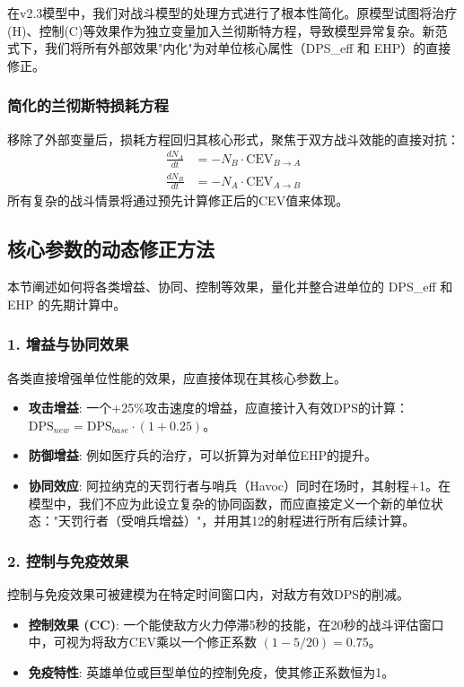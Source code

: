 \documentclass[a4paper,12pt]{article}
\begin{document}
在v2.3模型中，我们对战斗模型的处理方式进行了根本性简化。原模型试图将治疗(H)、控制(C)等效果作为独立变量加入兰彻斯特方程，导致模型异常复杂。新范式下，我们将所有外部效果"内化"为对单位核心属性（DPS\_eff 和 EHP）的直接修正。

\subsubsection{简化的兰彻斯特损耗方程}
移除了外部变量后，损耗方程回归其核心形式，聚焦于双方战斗效能的直接对抗：
\begin{align}
\frac{dN_A}{dt} &= -N_B \cdot \text{CEV}_{B \rightarrow A} \\
\frac{dN_B}{dt} &= -N_A \cdot \text{CEV}_{A \rightarrow B}
\end{align}
所有复杂的战斗情景将通过预先计算修正后的CEV值来体现。

\subsection{核心参数的动态修正方法}
本节阐述如何将各类增益、协同、控制等效果，量化并整合进单位的 DPS\_eff 和 EHP 的先期计算中。

\subsubsection{1. 增益与协同效果}
各类直接增强单位性能的效果，应直接体现在其核心参数上。
\begin{itemize}
    \item \textbf{攻击增益}: 一个+25\%攻击速度的增益，应直接计入有效DPS的计算：$\text{DPS}_{new} = \text{DPS}_{base} \cdot (1 + 0.25)$。
    \item \textbf{防御增益}: 例如医疗兵的治疗，可以折算为对单位EHP的提升。
    \item \textbf{协同效应}: 阿拉纳克的天罚行者与哨兵（Havoc）同时在场时，其射程+1。在模型中，我们不应为此设立复杂的协同函数，而应直接定义一个新的单位状态："天罚行者（受哨兵增益）"，并用其12的射程进行所有后续计算。
\end{itemize}

\subsubsection{2. 控制与免疫效果}
控制与免疫效果可被建模为在特定时间窗口内，对敌方有效DPS的削减。
\begin{itemize}
    \item \textbf{控制效果 (CC)}: 一个能使敌方火力停滞5秒的技能，在20秒的战斗评估窗口中，可视为将敌方CEV乘以一个修正系数 $(1 - 5/20) = 0.75$。
    \item \textbf{免疫特性}: 英雄单位或巨型单位的控制免疫，使其修正系数恒为1。
\end{itemize}
\end{document}
